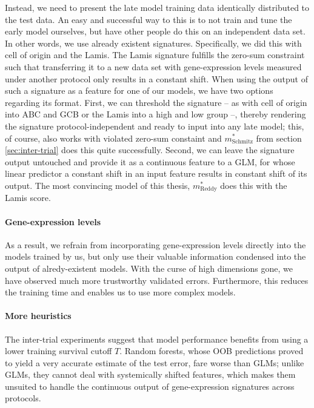 Instead, we need to present the late model training data identically distributed to the test 
data. An easy and successful way to this is to not train and tune the early model ourselves, but have 
other people do this on an independent data set. In other words, we use already existent signatures. 
Specifically, we did this with cell of origin and the Lamis. The Lamis signature fulfills the 
zero-sum constraint such that transferring it to a new data set with gene-expression levels 
measured under another protocol only results in a constant shift. When using the output of such 
a signature as a feature for one of our models, we have two options regarding its format.
First, we can threshold the signature -- as with cell of origin into ABC and GCB or the Lamis into 
a high and low group --, thereby rendering the signature protocol-independent and ready to input 
into any late model; this, of course, also works with violated zero-sum constaint and 
$m^*_\text{Schmitz}$ from section \ref{sec:inter-trial} 
does this quite successfully. Second, we can leave the signature output untouched and provide it as a 
continuous feature to a GLM, for whose linear predictor a constant shift in an input feature results 
in constant shift of its output. The most convincing model of this thesis, $m^*_\text{Reddy}$ does 
this with the Lamis score.

\paragraph{Gene-expression levels}
As a result, we refrain from incorporating gene-expression levels directly into the models trained 
by us, but only use their valuable information condensed into the output of alredy-existent models. 
With the curse of high dimensions gone, we have observed much more trustworthy validated errors. 
Furthermore, this reduces the training time and enables us to use more complex models.

\paragraph{More heuristics}

The inter-trial experiments suggest that model performance benefits from using a lower training 
survival cutoff $T$. Random forests, whose OOB predictions proved to yield a very accurate estimate 
of the test error, fare worse than GLMs; unlike GLMs, they cannot deal with systemically shifted 
features, which makes them unsuited to handle the continuous output of gene-expression signatures
across protocols.

